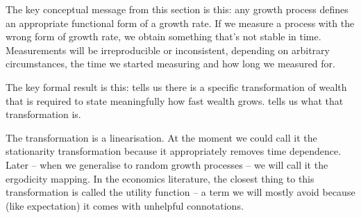 The key conceptual message from this section is this: any growth process defines an appropriate functional  form of a growth rate. If we measure a process with the wrong form of growth rate, we obtain something  that's not stable in time. Measurements will be irreproducible or inconsistent, depending on arbitrary  circumstances, \eg the time we started measuring and how long we measured for. 

The key formal result is this:  tells us there is a specific transformation of wealth that is
required to state meaningfully how fast wealth grows.  tells us what that transformation is.

The transformation is a linearisation. At the moment we could call it the stationarity transformation because it appropriately removes time dependence. Later -- when we generalise to random growth  processes -- we will call it the ergodicity mapping. In the economics literature, the closest thing to this transformation is called the utility function -- a term we will mostly avoid because (like expectation) it comes with unhelpful connotations.

